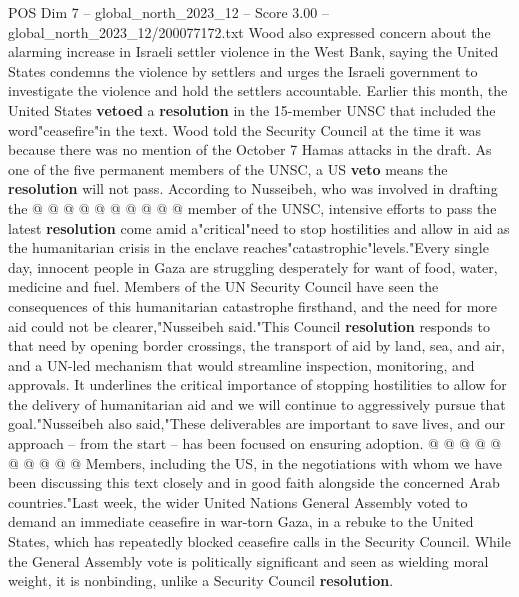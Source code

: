 \begin{textsample}{POS Dim 7 – global\_north\_2023\_12 – Score 3.00 – global\_north\_2023\_12/200077172.txt}
Wood also expressed concern about the alarming increase in Israeli settler violence in the West Bank, saying the United States condemns the violence by settlers and urges the Israeli government to investigate the violence and hold the settlers accountable.
Earlier this month, the United States \textbf{vetoed} a \textbf{resolution} in the 15-member UNSC that included the word"ceasefire"in the text.
Wood told the Security Council at the time it was because there was no mention of the October 7 Hamas attacks in the draft.
As one of the five permanent members of the UNSC, a US \textbf{veto} means the \textbf{resolution} will not pass.
According to Nusseibeh, who was involved in drafting the @ @ @ @ @ @ @ @ @ @ member of the UNSC, intensive efforts to pass the latest \textbf{resolution} come amid a"critical"need to stop hostilities and allow in aid as the humanitarian crisis in the enclave reaches"catastrophic"levels."Every single day, innocent people in Gaza are struggling desperately for want of food, water, medicine and fuel.
Members of the UN Security Council have seen the consequences of this humanitarian catastrophe firsthand, and the need for more aid could not be clearer,"Nusseibeh said."This Council \textbf{resolution} responds to that need by opening border crossings, the transport of aid by land, sea, and air, and a UN-led mechanism that would streamline inspection, monitoring, and approvals.
It underlines the critical importance of stopping hostilities to allow for the delivery of humanitarian aid and we will continue to aggressively pursue that goal."Nusseibeh also said,"These deliverables are important to save lives, and our approach -- from the start -- has been focused on ensuring adoption. @ @ @ @ @ @ @ @ @ @ Members, including the US, in the negotiations with whom we have been discussing this text closely and in good faith alongside the concerned Arab countries."Last week, the wider United Nations General Assembly voted to demand an immediate ceasefire in war-torn Gaza, in a rebuke to the United States, which has repeatedly blocked ceasefire calls in the Security Council.
While the General Assembly vote is politically significant and seen as wielding moral weight, it is nonbinding, unlike a Security Council \textbf{resolution}.

\end{textsample}
